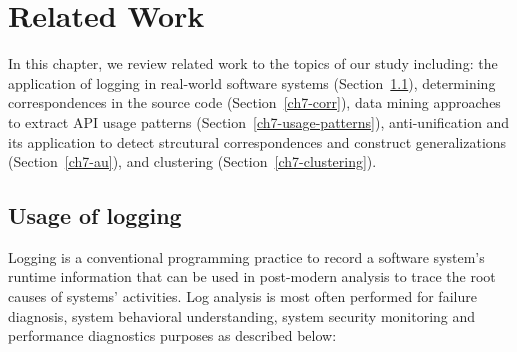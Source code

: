 \chapter{Related Work}  \label{rw}
In this chapter, we review related work to the topics of our study including: the application of logging in real-world software systems (Section~\ref{logging}), determining correspondences in the source code (Section~\ref{ch7-corr}), data mining approaches to extract API usage patterns (Section~\ref{ch7-usage-patterns}), anti-unification and its application to detect strcutural correspondences and construct generalizations (Section~\ref{ch7-au}), and clustering (Section~\ref{ch7-clustering}).
\section{Usage of logging}  \label{logging}
Logging is a conventional programming practice to record a software system's runtime information that can be used in post-modern analysis to trace the root causes of systems' activities. Log analysis is most often performed for failure diagnosis, system behavioral understanding, system security monitoring and performance diagnostics purposes as described below:
